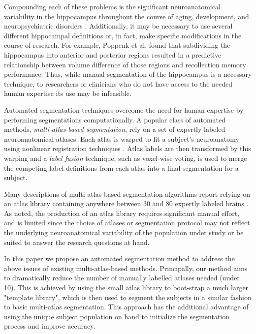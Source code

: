 \documentclass{article}\usepackage{graphicx, color}
\begin{document}
Compounding each of these problems is the significant neuroanatomical
variability in the hippocampus throughout the course of aging, development, and
neuropsychiatric disorders \citep{Mouiha2011}.  Additionally, it may be
necessary to use several different hippocampal definitions or, in fact, make
specific modifications in the course of research. For example, Poppenk et al.
\citep{Poppenk2011} found that subdividing the hippocampus into anterior and
posterior regions resulted in a predictive relationship between volume
difference of those regions and recollection memory performance.  Thus, while
manual segmentation of the hippocampus is a necessary technique, to researchers
or clinicians who do not have access to the needed human expertise its use may
be infeasible.  

Automated segmentation techniques overcome the need for human expertise by
performing segmentations computationally.  A popular class of automated
methods, {\it multi-atlas-based segmentation}, rely on a set of expertly
labeled neuroanatomical atlases. Each atlas is warped to fit a subject's
neuroanatomy using nonlinear registration
techniques \citep{Collins1995,Klein2009}.  Atlas labels are then transformed by
this warping and a {\it label fusion} technique, such as voxel-wise voting, is
used to merge the competing label definitions from each atlas into a final
segmentation for a subject.  

Many descriptions of multi-atlas-based segmentation algorithms report relying
on an atlas library containing anywhere between 30 and 80 expertly labeled
brains \citep{Heckemann2011,Collins2010,Aljabar2009,Leung2010,Lotjonen2010}.  As
noted, the production of an atlas library requires significant manual effort,
and is limited since the choice of atlases or segmentation protocol may not
reflect the underlying neuroanatomical variability of the population under
study or be suited to answer the research questions at hand.

In this paper we propose an automated segmentation method to address the above
issues of existing multi-atlas-based methods. Principally, our method aims to
dramatically reduce the number of manually labelled atlases needed (under 10).
This is achieved by using the small atlas library to boot-strap a much larger
"template library", which is then used to segment the subjects in a similar
fashion to basic multi-atlas segmentation. This approach has the additional
advantage of using the unique subject population on hand to initialize the
segmentation process and improve accuracy.
\end{document}
